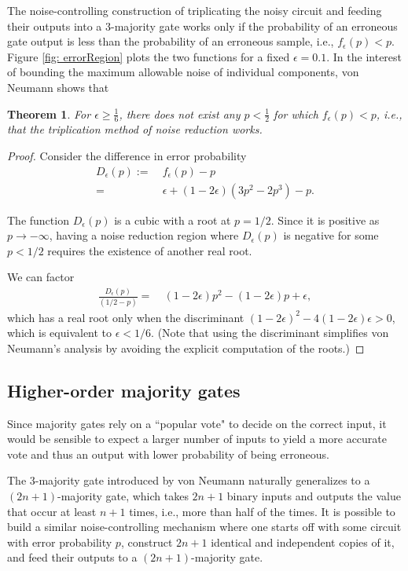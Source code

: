 \documentclass[12pt,reqno]{amsart}
\theoremstyle{plain} %
\newtheorem{theorem}{Theorem}[section]
\theoremstyle{remark}
\theoremstyle{definition}
\begin{document}
The noise-controlling construction of triplicating the noisy circuit and feeding their outputs into a 3-majority gate works only if the probability of an erroneous gate output is less than the probability of an erroneous sample, i.e., $f_{\epsilon}(p)<p$. Figure \ref{fig: errorRegion} plots the two functions for a fixed $\epsilon=0.1$. In the interest of bounding the maximum allowable noise of individual components, von Neumann shows that
\begin{theorem}\label{thm: vN}
    For $\epsilon\ge\frac{1}{6}$, there does not exist any $p<\frac{1}{2}$ for which $f_{\epsilon}(p)<p$, i.e., that the triplication method of noise reduction works.
\end{theorem}
\begin{proof}
    Consider the difference in error probability 
    \begin{align}
        D_{\epsilon}(p):=&\ f_{\epsilon}(p)-p\\
        =&\ \epsilon+(1-2\epsilon)(3p^2-2p^3)-p.
    \end{align}

The function $D_{\epsilon}(p)$ is a cubic with a root at $p=1/2$. Since it is positive as $p\to-\infty$, having a noise reduction region where $D_{\epsilon}(p)$ is negative for some $p<1/2$ requires the existence of another real root. 

We can factor
\begin{align}
    \frac{D_{\epsilon}(p)}{(1/2-p)}=&\ (1-2\epsilon)p^2-(1-2\epsilon)p+\epsilon,
\end{align}
which has a real root only when the discriminant $(1-2\epsilon)^2-4(1-2\epsilon)\epsilon>0$, which is equivalent to $\epsilon<1/6$. (Note that using the discriminant simplifies von Neumann's analysis by avoiding the explicit computation of the roots.)
\end{proof}




\subsection{Higher-order majority gates}

Since majority gates rely on a ``popular vote" to decide on the correct input, it would be sensible to expect a larger number of inputs to yield a more accurate vote and thus an output with lower probability of being erroneous.

The $3$-majority gate introduced by von Neumann naturally generalizes to a $(2n+1)$-majority gate, which takes $2n+1$ binary inputs and outputs the value that occur at least $n+1$ times, i.e., more than half of the times. It is possible to build a similar noise-controlling mechanism where one starts off with some circuit with error probability $p$, construct $2n+1$ identical and independent copies of it, and feed their outputs to a $(2n+1)$-majority gate.
\end{document}

